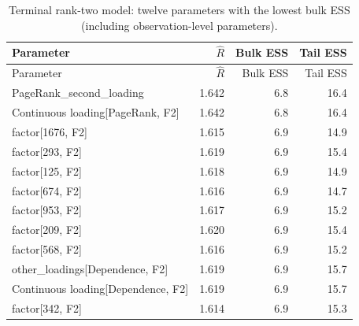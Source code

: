 \documentclass[pdftex,12pt,openright,a4paper,oneside]{book}
\begin{document}
\begin{longtable}{@{}p{}rrr@{}}

\caption{Terminal rank-two model: twelve parameters with the lowest bulk ESS (including observation-level parameters).}\label{tab:terminal_rank2_lowess}\\

\toprule

Parameter & $\widehat R$ & Bulk ESS & Tail ESS \\

\midrule\endfirsthead

\toprule

Parameter & $\widehat R$ & Bulk ESS & Tail ESS \\

\midrule\endhead

PageRank\_second\_loading & 1.642 & 6.8 & 16.4 \\

Continuous loading[PageRank, F2] & 1.642 & 6.8 & 16.4 \\

factor[1676, F2] & 1.615 & 6.9 & 14.9 \\

factor[293, F2] & 1.619 & 6.9 & 15.4 \\

factor[125, F2] & 1.618 & 6.9 & 14.9 \\

factor[674, F2] & 1.616 & 6.9 & 14.7 \\

factor[953, F2] & 1.617 & 6.9 & 15.2 \\

factor[209, F2] & 1.620 & 6.9 & 15.4 \\

factor[568, F2] & 1.616 & 6.9 & 15.2 \\

other\_loadings[Dependence, F2] & 1.619 & 6.9 & 15.7 \\

Continuous loading[Dependence, F2] & 1.619 & 6.9 & 15.7 \\

factor[342, F2] & 1.614 & 6.9 & 15.3 \\

\bottomrule\end{longtable}
\end{document}
